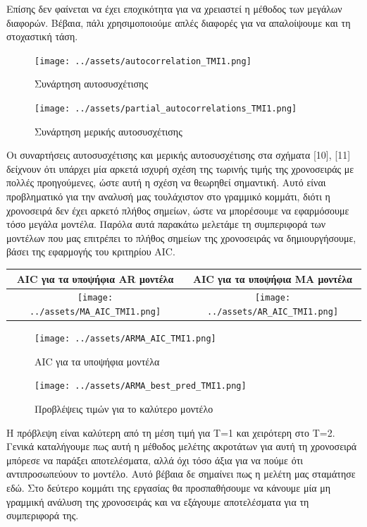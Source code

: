 \documentclass[11pt,]{article}
\begin{document}
Επίσης δεν φαίνεται να έχει εποχικότητα για να χρειαστεί η μέθοδος των
μεγάλων διαφορών. Βέβαια, πάλι χρησιμοποιούμε απλές διαφορές για να
απαλοίψουμε και τη στοχαστική τάση.

\begin{figure}
\centering
\texttt{[image: ../assets/autocorrelation\_TMI1.png]}
\caption{Συνάρτηση αυτοσυσχέτισης}
\end{figure}

\begin{figure}
\centering
\texttt{[image: ../assets/partial\_autocorrelations\_TMI1.png]}
\caption{Συνάρτηση μερικής αυτοσυσχέτισης}
\end{figure}

Οι συναρτήσεις αυτοσυσχέτισης και μερικής αυτοσυσχέτισης στα σχήματα
{[}10{]}, {[}11{]} δείχνουν ότι υπάρχει μία αρκετά ισχυρή σχέση της
τωρινής τιμής της χρονοσειράς με πολλές προηγούμενες, ώστε αυτή η σχέση
να θεωρηθεί σημαντική. Αυτό είναι προβληματικό για την αναλυσή μας
τουλάχιστον στο γραμμικό κομμάτι, διότι η χρονοσειρά δεν έχει αρκετό
πλήθος σημείων, ώστε να μπορέσουμε να εφαρμόσουμε τόσο μεγάλα μοντέλα.
Παρόλα αυτά παρακάτω μελετάμε τη συμπεριφορά των μοντέλων που μας
επιτρέπει το πλήθος σημείων της χρονοσειράς να δημιουργήσουμε, βάσει της
εφαρμογής του κριτηρίου AIC.

\begin{longtable}[]{@{}cc@{}}
\toprule
AIC για τα υποψήφια AR μοντέλα & AIC για τα υποψήφια MA
μοντέλα\tabularnewline
\midrule
\endhead
\texttt{[image: ../assets/MA\_AIC\_TMI1.png]}
&
\texttt{[image: ../assets/AR\_AIC\_TMI1.png]}\tabularnewline
\bottomrule
\end{longtable}

\begin{figure}
\centering
\texttt{[image: ../assets/ARMA\_AIC\_TMI1.png]}
\caption{AIC για τα υποψήφια μοντέλα}
\end{figure}

\begin{figure}
\centering
\texttt{[image: ../assets/ARMA\_best\_pred\_TMI1.png]}
\caption{Προβλέψεις τιμών για το καλύτερο μοντέλο}
\end{figure}

H πρόβλεψη είναι καλύτερη από τη μέση τιμή για T=1 και χειρότερη στο
T=2. Γενικά καταλήγουμε πως αυτή η μέθοδος μελέτης ακροτάτων για αυτή τη
χρονοσειρά μπόρεσε να παράξει αποτελέσματα, αλλά όχι τόσο άξια για να
πούμε ότι αντιπροσωπεύουν το μοντέλο. Αυτό βέβαια δε σημαίνει πως η
μελέτη μας σταμάτησε εδώ. Στο δεύτερο κομμάτι της εργασίας θα
προσπαθήσουμε να κάνουμε μία μη γραμμική ανάλυση της χρονοσειράς και να
εξάγουμε αποτελέσματα για τη συμπεριφορά της.
\end{document}
